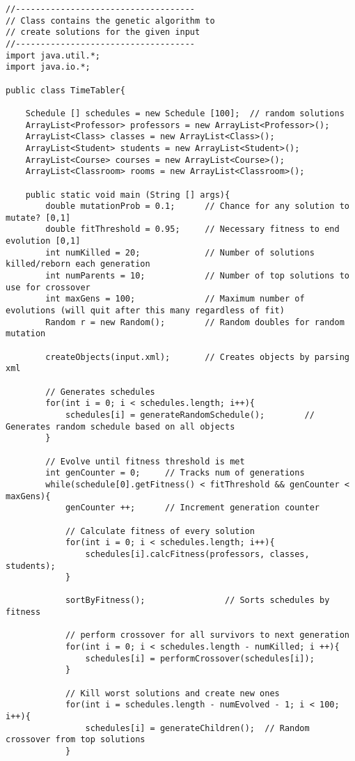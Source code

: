 \documentclass{article}
\begin{document}
\begin{lstlisting}
//------------------------------------
// Class contains the genetic algorithm to
// create solutions for the given input
//------------------------------------
import java.util.*;
import java.io.*;

public class TimeTabler{

	Schedule [] schedules = new Schedule [100];  // random solutions
	ArrayList<Professor> professors = new ArrayList<Professor>();
	ArrayList<Class> classes = new ArrayList<Class>();
	ArrayList<Student> students = new ArrayList<Student>();
	ArrayList<Course> courses = new ArrayList<Course>();
	ArrayList<Classroom> rooms = new ArrayList<Classroom>();

	public static void main (String [] args){
		double mutationProb = 0.1; 		// Chance for any solution to mutate? [0,1]
		double fitThreshold = 0.95;		// Necessary fitness to end evolution [0,1]
		int numKilled = 20;				// Number of solutions killed/reborn each generation
		int numParents = 10;			// Number of top solutions to use for crossover
		int maxGens = 100;				// Maximum number of evolutions (will quit after this many regardless of fit)
		Random r = new Random();		// Random doubles for random mutation

		createObjects(input.xml);		// Creates objects by parsing xml

		// Generates schedules
		for(int i = 0; i < schedules.length; i++){
			schedules[i] = generateRandomSchedule();		// Generates random schedule based on all objects
		}

		// Evolve until fitness threshold is met
		int genCounter = 0;		// Tracks num of generations
		while(schedule[0].getFitness() < fitThreshold && genCounter < maxGens){
			genCounter ++; 		// Increment generation counter

			// Calculate fitness of every solution
			for(int i = 0; i < schedules.length; i++){
				schedules[i].calcFitness(professors, classes, students);
			}

			sortByFitness();				// Sorts schedules by fitness

			// perform crossover for all survivors to next generation
			for(int i = 0; i < schedules.length - numKilled; i ++){
				schedules[i] = performCrossover(schedules[i]);
			}

			// Kill worst solutions and create new ones
			for(int i = schedules.length - numEvolved - 1; i < 100; i++){
				schedules[i] = generateChildren();	// Random crossover from top solutions
			}


\end{lstlisting}
\end{document}
